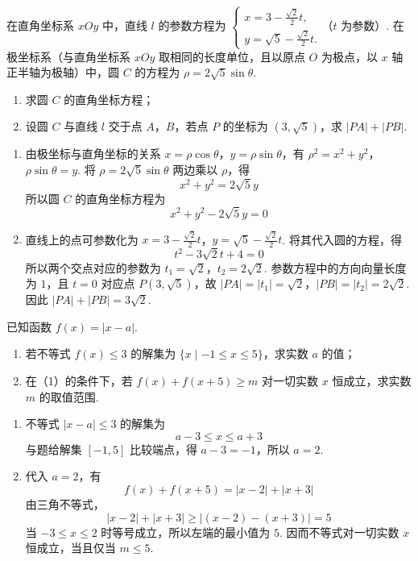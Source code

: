 \begin{problem}
在直角坐标系 \(xOy\) 中，直线 \(l\) 的参数方程为 \(\begin{cases}
x = 3 - \frac{\sqrt{2}}{2} t,\\
y = \sqrt{5} - \frac{\sqrt{2}}{2} t.
\end{cases}\)（\(t\) 为参数）. 在极坐标系（与直角坐标系 \(xOy\) 取相同的长度单位，且以原点 \(O\) 为极点，以 \(x\) 轴正半轴为极轴）中，圆 \(C\) 的方程为 \(\rho = 2\sqrt{5}\sin \theta\).
\begin{enumerate}
\item 求圆 \(C\) 的直角坐标方程；
\item 设圆 \(C\) 与直线 \(l\) 交于点 \(A\)，\(B\)，若点 \(P\) 的坐标为 \((3, \sqrt{5})\)，求 \(|PA| + |PB|\).
\end{enumerate}
\end{problem}

\begin{solution}
\begin{enumerate}
\item 由极坐标与直角坐标的关系 \(x=\rho\cos\theta\)，\(y=\rho\sin\theta\)，有
\(\rho^{2}=x^{2}+y^{2}\)，\(\rho\sin\theta=y\).
将 \(\rho=2\sqrt5\sin\theta\) 两边乘以 \(\rho\)，得
\[
x^{2}+y^{2}=2\sqrt5y
\]
所以圆 \(C\) 的直角坐标方程为
\[
x^{2}+y^{2}-2\sqrt5y=0
\]

\item 直线上的点可参数化为
\(x=3-\frac{\sqrt2}{2}t\)，\(y=\sqrt5-\frac{\sqrt2}{2}t\).
将其代入圆的方程，得
\[
t^{2}-3\sqrt2t+4=0
\]
所以两个交点对应的参数为
\(t_{1}=\sqrt2\)，\(t_{2}=2\sqrt2\).
参数方程中的方向向量长度为 \(1\)，且 \(t=0\) 对应点 \(P(3,\sqrt5)\)，故
\(|PA|=|t_{1}|=\sqrt2\)，\(|PB|=|t_{2}|=2\sqrt2\).
因此 \(|PA|+|PB|=3\sqrt2\).
\end{enumerate}
\end{solution}

\begin{problem}
已知函数 \(f(x) = |x - a|\).
\begin{enumerate}
\item 若不等式 \(f(x) \leqslant 3\) 的解集为 \(\{x \mid -1 \leqslant x \leqslant 5\}\)，求实数 \(a\) 的值；
\item 在（1）的条件下，若 \(f(x) + f(x + 5) \geqslant m\) 对一切实数 \(x\) 恒成立，求实数 \(m\) 的取值范围.
\end{enumerate}
\end{problem}

\begin{solution}
\begin{enumerate}
\item 不等式 \(|x-a|\leqslant3\) 的解集为
\[
a-3\leqslant x\leqslant a+3
\]
与题给解集 \([-1,5]\) 比较端点，得 \(a-3=-1\)，所以 \(a=2\).

\item 代入 \(a=2\)，有
\[
f(x)+f(x+5)=|x-2|+|x+3|
\]
由三角不等式，
\[
|x-2|+|x+3|\geqslant|(x-2)-(x+3)|=5
\]
当 \(-3\leqslant x\leqslant2\) 时等号成立，所以左端的最小值为 \(5\). 因而不等式对一切实数 \(x\) 恒成立，当且仅当 \(m\leqslant5\).
\end{enumerate}
\end{solution}
